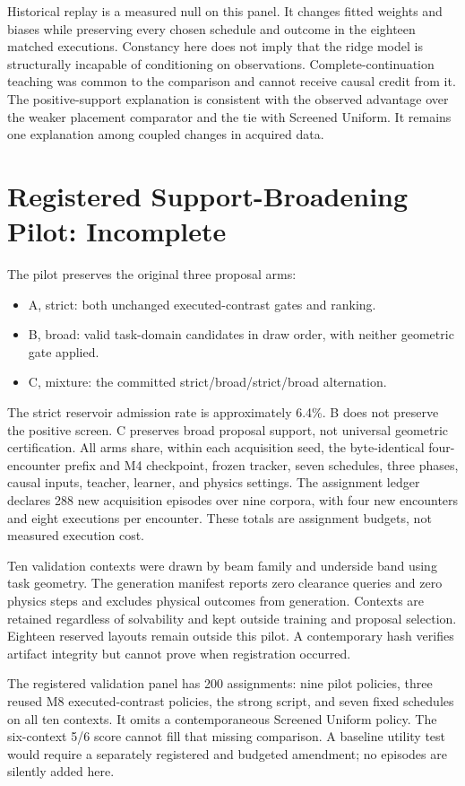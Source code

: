 \documentclass[letterpaper,10pt,conference]{ieeeconf}
\begin{document}
Historical replay is a measured null on this panel. It changes fitted weights
and biases while preserving every chosen schedule and outcome in the eighteen
matched executions. Constancy here does not imply that the ridge model is
structurally incapable of conditioning on observations. Complete-continuation
teaching was common to the comparison and cannot receive causal credit from it.
The positive-support explanation is consistent with the observed advantage
over the weaker placement comparator and the tie with Screened Uniform. It
remains one explanation among coupled changes in acquired data.

\section{Registered Support-Broadening Pilot: Incomplete}
The pilot preserves the original three proposal arms:
\begin{itemize}
\item A, strict: both unchanged executed-contrast gates and ranking.
\item B, broad: valid task-domain candidates in draw order, with neither
geometric gate applied.
\item C, mixture: the committed strict/broad/strict/broad alternation.
\end{itemize}
The strict reservoir admission rate is approximately 6.4\%. B does not preserve
the positive screen. C preserves broad proposal support, not universal geometric
certification. All arms share, within each acquisition seed, the byte-identical
four-encounter prefix and M4 checkpoint, frozen tracker, seven schedules, three
phases, causal inputs, teacher, learner, and physics settings. The assignment
ledger declares 288 new acquisition episodes over nine corpora, with four new
encounters and eight executions per encounter. These totals are assignment
budgets, not measured execution cost.

Ten validation contexts were drawn by beam family and underside band using
task geometry. The generation manifest reports zero clearance queries and zero
physics steps and excludes physical outcomes from generation. Contexts are
retained regardless of solvability and kept outside training and proposal
selection. Eighteen reserved layouts remain outside this pilot. A contemporary
hash verifies artifact integrity but cannot prove when registration occurred.

The registered validation panel has 200 assignments: nine pilot policies,
three reused M8 executed-contrast policies, the strong script, and seven fixed
schedules on all ten contexts. It omits a contemporaneous Screened Uniform
policy. The six-context 5/6 score cannot fill that missing comparison. A baseline
utility test would require a separately registered and budgeted amendment;
no episodes are silently added here.
\end{document}
